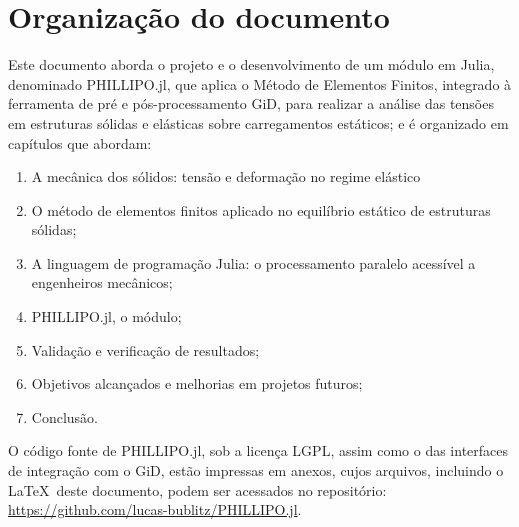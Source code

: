 \section{Organização do documento}

Este documento aborda o projeto e o desenvolvimento de um módulo em Julia, denominado PHILLIPO.jl, que aplica o Método de Elementos Finitos, integrado à ferramenta de pré e pós-processamento GiD, para realizar a análise das tensões em estruturas sólidas e elásticas sobre carregamentos estáticos; e é organizado em capítulos que abordam:

\begin{enumerate}
    \item A mecânica dos sólidos: tensão e deformação no regime elástico
    \item O método de elementos finitos aplicado no equilíbrio estático de estruturas sólidas;
    \item A linguagem de programação Julia: o processamento paralelo acessível a engenheiros mecânicos;
    \item PHILLIPO.jl, o módulo;
    \item Validação e verificação de resultados;
    \item Objetivos alcançados e melhorias em projetos futuros;
    \item Conclusão.
\end{enumerate}

O código fonte de PHILLIPO.jl, sob a licença LGPL, assim como o das interfaces de integração com o GiD, estão impressas em anexos, cujos arquivos, incluindo o \LaTeX\ deste documento, podem ser acessados no repositório: \url{https://github.com/lucas-bublitz/PHILLIPO.jl}.